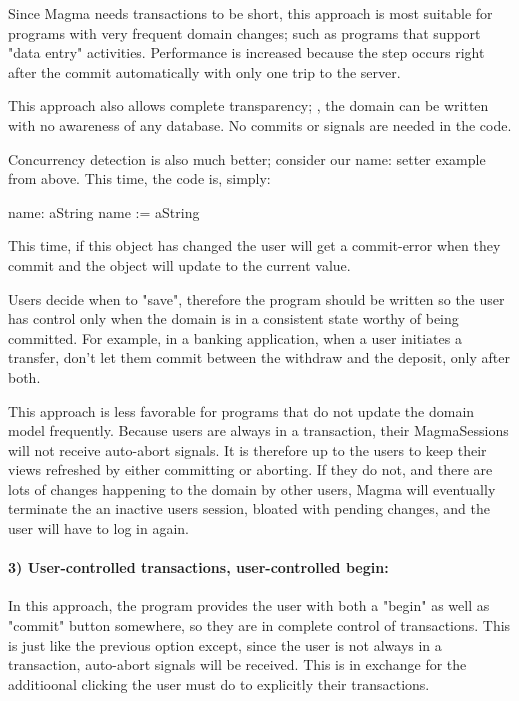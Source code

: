 \documentclass[a4paper,10pt,twoside]{book}
\begin{document}
Since Magma needs transactions to be short, this approach is most suitable for programs with very frequent domain changes; such as programs that support "data entry" activities. Performance is increased because the  step occurs right after the commit automatically with only one trip to the server.

This approach also allows complete transparency; \ie, the domain can be written with no awareness of any database. No commits or signals are needed in the code.

Concurrency detection is also much better; consider our name: setter example from above. This time, the code is, simply:

\begin{code}{}
	name: aString
		name := aString
\end{code}

This time, if this object has changed the user will get a commit-error when they commit and the object will update to the current value.

Users decide when to "save", therefore the program should be written so the user has control only when the domain is in a consistent state worthy of being committed. For example, in a banking application, when a user initiates a transfer, don't let them commit between the withdraw and the deposit, only after both.

This approach is less favorable for programs that do not update the domain model frequently. Because users are always in a transaction, their MagmaSessions will not receive auto-abort signals. It is therefore up to the users to keep their views refreshed by either committing or aborting. If they do not, and there are lots of changes happening to the domain by other users, Magma will eventually terminate the an inactive users session, bloated with pending changes, and the user will have to log in again.


\paragraph{3) User-controlled transactions, user-controlled begin:} In this approach, the program provides the user with both a "begin" as well as "commit" button somewhere, so they are in complete control of transactions. This is just like the previous option except, since the user is not always in a transaction, auto-abort signals will be received. This is in exchange for the additioonal clicking the user must do to explicitly  their transactions.
\end{document}
